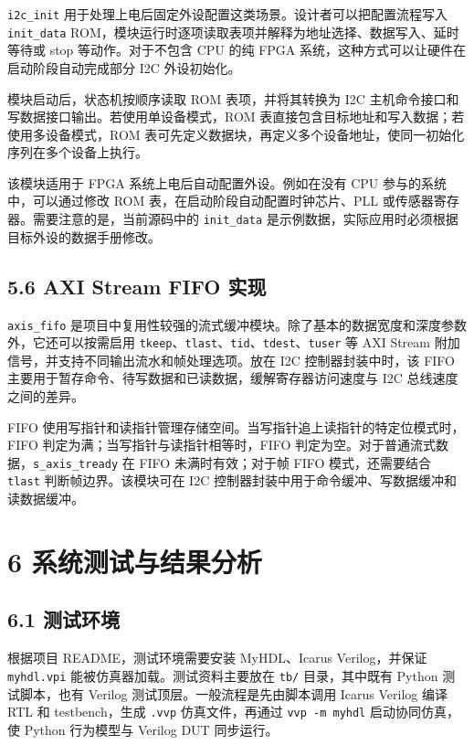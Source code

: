 \texttt{i2c\_init}
用于处理上电后固定外设配置这类场景。设计者可以把配置流程写入
\texttt{init\_data}
ROM，模块运行时逐项读取表项并解释为地址选择、数据写入、延时等待或 stop
等动作。对于不包含 CPU 的纯 FPGA
系统，这种方式可以让硬件在启动阶段自动完成部分 I2C 外设初始化。

模块启动后，状态机按顺序读取 ROM 表项，并将其转换为 I2C
主机命令接口和写数据接口输出。若使用单设备模式，ROM
表直接包含目标地址和写入数据；若使用多设备模式，ROM
表可先定义数据块，再定义多个设备地址，使同一初始化序列在多个设备上执行。

该模块适用于 FPGA 系统上电后自动配置外设。例如在没有 CPU
参与的系统中，可以通过修改 ROM 表，在启动阶段自动配置时钟芯片、PLL
或传感器寄存器。需要注意的是，当前源码中的 \texttt{init\_data}
是示例数据，实际应用时必须根据目标外设的数据手册修改。

\subsection{5.6 AXI Stream FIFO
实现}\label{axi-stream-fifo-ux5b9eux73b0}

\texttt{axis\_fifo}
是项目中复用性较强的流式缓冲模块。除了基本的数据宽度和深度参数外，它还可以按需启用
\texttt{tkeep}、\texttt{tlast}、\texttt{tid}、\texttt{tdest}、\texttt{tuser}
等 AXI Stream 附加信号，并支持不同输出流水和帧处理选项。放在 I2C
控制器封装中时，该 FIFO
主要用于暂存命令、待写数据和已读数据，缓解寄存器访问速度与 I2C
总线速度之间的差异。

FIFO
使用写指针和读指针管理存储空间。当写指针追上读指针的特定位模式时，FIFO
判定为满；当写指针与读指针相等时，FIFO
判定为空。对于普通流式数据，\texttt{s\_axis\_tready} 在 FIFO
未满时有效；对于帧 FIFO 模式，还需要结合 \texttt{tlast}
判断帧边界。该模块可在 I2C
控制器封装中用于命令缓冲、写数据缓冲和读数据缓冲。

\section{6
系统测试与结果分析}\label{ux7cfbux7edfux6d4bux8bd5ux4e0eux7ed3ux679cux5206ux6790}

\subsection{6.1 测试环境}\label{ux6d4bux8bd5ux73afux5883}

根据项目 README，测试环境需要安装 MyHDL、Icarus Verilog，并保证
\texttt{myhdl.vpi} 能被仿真器加载。测试资料主要放在 \texttt{tb/}
目录，其中既有 Python 测试脚本，也有 Verilog
测试顶层。一般流程是先由脚本调用 Icarus Verilog 编译 RTL 和
testbench，生成 \texttt{.vvp} 仿真文件，再通过 \texttt{vvp\ -m\ myhdl}
启动协同仿真，使 Python 行为模型与 Verilog DUT 同步运行。

